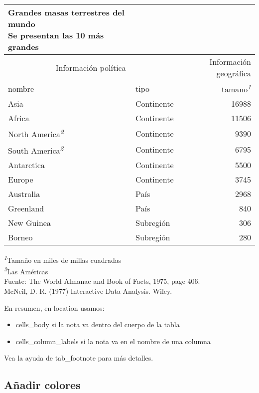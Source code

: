 \documentclass[
]{article}
\providecommand{\tightlist}{%
  \setlength{\itemsep}{0pt}\setlength{\parskip}{0pt}}
\begin{document}
\setlength{\LTpost}{0mm}
\begin{longtable}{llr}
\caption*{
{\large Grandes masas terrestres del mundo} \\ 
{\small Se presentan las 10 más grandes}
} \\ 
\toprule
\multicolumn{2}{c}{Información política} & Información geográfica \\ 
\cmidrule(lr){1-2} \cmidrule(lr){3-3}
nombre & tipo & tamano\textsuperscript{\textit{1}} \\ 
\midrule
Asia & Continente & 16988 \\ 
Africa & Continente & 11506 \\ 
North America\textsuperscript{\textit{2}} & Continente & 9390 \\ 
South America\textsuperscript{\textit{2}} & Continente & 6795 \\ 
Antarctica & Continente & 5500 \\ 
Europe & Continente & 3745 \\ 
Australia & País & 2968 \\ 
Greenland & País & 840 \\ 
New Guinea & Subregión & 306 \\ 
Borneo & Subregión & 280 \\ 
\bottomrule
\end{longtable}
\begin{minipage}{\linewidth}
\textsuperscript{\textit{1}}Tamaño en miles de millas cuadradas\\
\textsuperscript{\textit{2}}Las Américas\\
Fuente: The World Almanac and Book of Facts, 1975, page 406.\\
McNeil, D. R. (1977) Interactive Data Analysis. Wiley.\\
\end{minipage}

En resumen, en location usamos:

\begin{itemize}
\tightlist
\item
  cells\_body si la nota va dentro del cuerpo de la tabla
\item
  cells\_column\_labels si la nota va en el nombre de una columna
\end{itemize}

Vea la ayuda de tab\_footnote para más detalles.

\hypertarget{auxf1adir-colores}{%
\subsection{Añadir colores}\label{auxf1adir-colores}}
\end{document}
